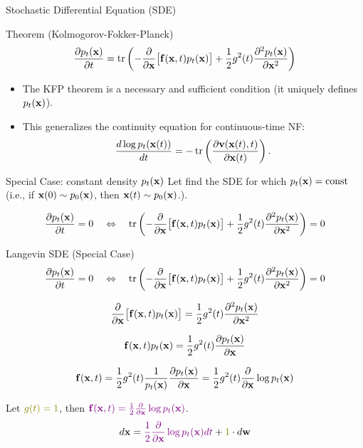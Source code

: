 \documentclass{beamer}
\renewcommand{\eqpause}{}
\begin{document}
\begin{frame}{Stochastic Differential Equation (SDE)}
	\begin{block}{Theorem (Kolmogorov-Fokker-Planck)}
		\vspace{-0.2cm}
		\[
			\frac{\partial p_t(\mathbf{x})}{\partial t} = \operatorname{tr}\left( - \frac{\partial}{\partial \mathbf{x}} \bigl[ \mathbf{f}(\mathbf{x}, t) p_t(\mathbf{x})\bigr] + \frac{1}{2} g^2(t) \frac{\partial^2 p_t(\mathbf{x})}{\partial \mathbf{x}^2}\right)
		\]
		\vspace{-0.2cm}
	\end{block}
	\begin{itemize}
		\item The KFP theorem is a necessary and sufficient condition (it uniquely defines $p_t(\mathbf{x})$).
		\item This generalizes the continuity equation for continuous-time NF:
		\[
			\frac{d \log p_t(\mathbf{x}(t))}{d t} = - \operatorname{tr} \left( \frac{\partial \mathbf{v}(\mathbf{x}(t), t)}{\partial \mathbf{x}(t)} \right).
		\]
	\end{itemize}
	\eqpause
	\begin{block}{Special Case: constant density $p_t(\mathbf{x})$}
		Let find the SDE for which $p_t(\mathbf{x}) = \text{const}$ (i.e., if $\mathbf{x}(0) \sim p_0(\mathbf{x})$, then $\mathbf{x}(t) \sim p_0(\mathbf{x})$.).
		\eqpause
		\[
			\frac{\partial p_t(\mathbf{x})}{\partial t} = 0 \quad \Leftrightarrow \quad \operatorname{tr}\left( - \frac{\partial}{\partial \mathbf{x}} \bigl[ \mathbf{f}(\mathbf{x}, t) p_t(\mathbf{x})\bigr] + \frac{1}{2} g^2(t) \frac{\partial^2 p_t(\mathbf{x})}{\partial \mathbf{x}^2}\right) = 0
		\]
	\end{block}
\end{frame}
\begin{frame}{Langevin SDE (Special Case)}
	\[
		\frac{\partial p_t(\mathbf{x})}{\partial t} = 0 \quad \Leftrightarrow \quad \operatorname{tr}\left( - \frac{\partial}{\partial \mathbf{x}} \bigl[ \mathbf{f}(\mathbf{x}, t) p_t(\mathbf{x})\bigr] + \frac{1}{2} g^2(t) \frac{\partial^2 p_t(\mathbf{x})}{\partial \mathbf{x}^2}\right) = 0
	\]
	\vspace{-0.3cm}
	\eqpause
	\[
		\frac{\partial}{\partial \mathbf{x}} \bigl[ \mathbf{f}(\mathbf{x}, t) p_t(\mathbf{x})\bigr] = \frac{1}{2} g^2(t) \frac{\partial^2 p_t(\mathbf{x})}{\partial \mathbf{x}^2}
	\]
	\eqpause
	\[
		\mathbf{f}(\mathbf{x}, t) p_t(\mathbf{x}) = \frac{1}{2} g^2(t) \frac{\partial p_t(\mathbf{x})}{\partial \mathbf{x}}
	\]
	\eqpause
	\[
		\mathbf{f}(\mathbf{x}, t) = \frac{1}{2} g^2(t) \frac{1}{p_t(\mathbf{x})}\frac{\partial p_t(\mathbf{x})}{\partial \mathbf{x}} = \frac{1}{2} g^2(t) \frac{\partial}{\partial \mathbf{x}} \log p_t(\mathbf{x})
	\]
	\eqpause
	Let ${\color{olive}g(t)=1}$, then ${\color{violet}\mathbf{f}(\mathbf{x}, t) = \frac{1}{2} \frac{\partial}{\partial \mathbf{x}} \log p_t(\mathbf{x})}$.
	\[
		d \bx = {\color{violet}\frac{1}{2} \frac{\partial}{\partial \bx} \log p_t(\bx) d t} + {\color{olive}1} \cdot d \bw
	\]
\end{frame}
\end{document}
